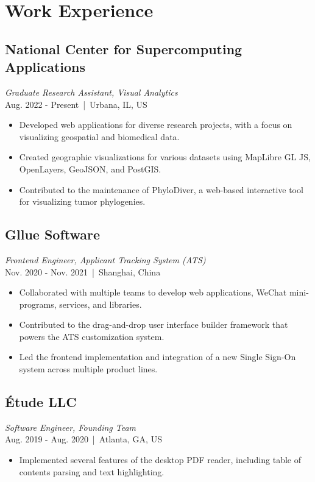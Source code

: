 \documentclass[11pt]{article}
\begin{document}
\begin{minipage}{280pt}

\section*{\sc Work Experience}

\subsection*{National Center for Supercomputing Applications}
\textit{Graduate Research Assistant, Visual Analytics} \\
Aug. 2022 - Present \,|\, Urbana, IL, US\\
\begin{itemize}
\item Developed web applications for diverse research projects, with a focus on visualizing geospatial and biomedical data.
\item Created geographic visualizations for various datasets using MapLibre GL JS, OpenLayers, GeoJSON, and PostGIS.
\item Contributed to the maintenance of PhyloDiver, a web-based interactive tool for visualizing tumor phylogenies.
\end{itemize}

\subsection*{Gllue Software}
\textit{Frontend Engineer, Applicant Tracking System (ATS)}\\
Nov. 2020 - Nov. 2021 \,|\, Shanghai, China\\
\begin{itemize}
\item Collaborated with multiple teams to develop web applications, WeChat mini-programs, services, and libraries.
\item Contributed to the drag-and-drop user interface builder framework that powers the ATS customization system.
\item Led the frontend implementation and integration of a new Single Sign-On system across multiple product lines.
\end{itemize}

\subsection*{Étude LLC}
\textit{Software Engineer, Founding Team}\\
Aug. 2019 - Aug. 2020 \,|\,  Atlanta, GA, US\\
\begin{itemize}
\item Implemented several features of the desktop PDF reader, including table of contents parsing and text highlighting.
\end{itemize}


\end{minipage}
\end{document}
